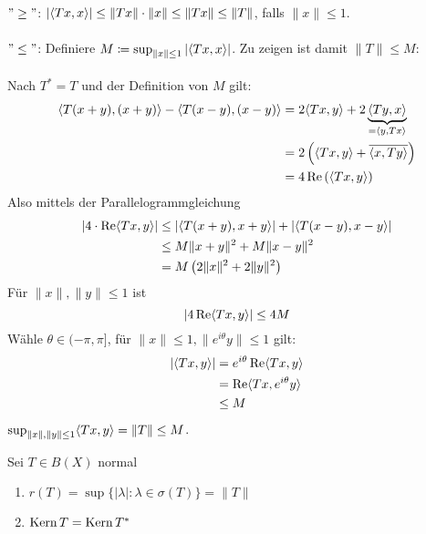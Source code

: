 \begin{beweis}
	$" \geq "$: $| \langle T x , x \rangle | \leq \| T x \| \cdot \|x \| \leq \| T x \| \leq \| T \|$, falls $\| x \| \leq 1$. \\ \\
	$" \leq "$: Definiere $M \coloneqq \sup_{\| x \| \leq 1} \left| \langle T x , x \rangle \right|$. Zu zeigen ist damit $\| T \| \leq M$: \\ \\
	Nach $T^{*} = T$ und der Definition von $M$ gilt:
	\begin{align*}
		\langle T ( x + y ) , ( x + y ) \rangle - \langle T ( x - y ) , ( x - y) \rangle & = 2 \langle T x , y \rangle + 2 \underbrace{\langle T y , x \rangle}_{= \langle y , T x \rangle} \\
			& = 2 \left( \langle T x , y \rangle + \overline{\langle x , T y \rangle} \right) \\
			& = 4 \mathop{\rm Re}\nolimits \left( \langle T x , y \rangle \right)
	\end{align*}
	Also mittels der Parallelogrammgleichung 
	\begin{align*}
		| 4 \cdot \mathop{\rm Re}\nolimits \langle T x , y \rangle | & \leq | \langle T ( x + y ) ,  x + y \rangle | + | \langle T ( x - y ) , x - y \rangle | \\
			& \leq M \| x + y \|^{2} + M \| x - y \|^{2} \\
			& = M \left( 2 \| x \|^{2} + 2 \| y \|^{2} \right)
	\end{align*}
	Für $\| x \|, \| y \| \leq 1$ ist 
		\[ | 4 \mathop{\rm Re}\nolimits \langle T x , y \rangle | \leq 4 M \]
	Wähle $\theta \in (-\pi , \pi]$, für $\| x \| \leq 1, \| e^{i \theta} y \| \leq 1$ gilt:
	\begin{align*}
		| \langle T x, y \rangle | & = e^{i \theta} \mathop{\rm Re}\nolimits \langle T x , y \rangle \\
						 & = \mathop{\rm Re}\nolimits\langle T x , e^{i \theta} y \rangle \\
						 & \leq M
	\end{align*}
	$\sup_{\| x \|, \| y \| \leq 1} \langle T x , y \rangle = \| T \| \leq M$.
\end{beweis}


\begin{prop} \label{prop:19.9}
	Sei $T \in B(X)$ normal
	\begin{enumerate}[label=\alph*\upshape)]
		\item $r(T) = \sup \{ | \lambda | : \lambda \in \sigma(T) \} = \| T \|$
		\item $\mathop{\rm Kern}\nolimits T = \mathop{\rm Kern}\nolimits T^{*}$
	\end{enumerate}	
\end{prop}

